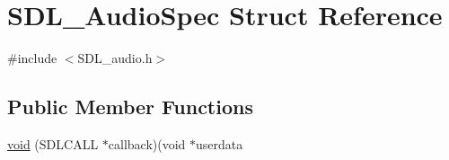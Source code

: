 \hypertarget{structSDL__AudioSpec}{\section{S\+D\+L\+\_\+\+Audio\+Spec Struct Reference}
\label{structSDL__AudioSpec}
}


{\ttfamily \#include $<$S\+D\+L\+\_\+audio.\+h$>$}

\subsection*{Public Member Functions}
\begin{DoxyCompactItemize}
\item 
\hyperlink{structSDL__AudioSpec_ab8a359069a60f225ab6e35a55dfb3d92}{void} (S\+D\+L\+C\+A\+L\+L $\ast$callback)(void $\ast$userdata
\end{DoxyCompactItemize}
